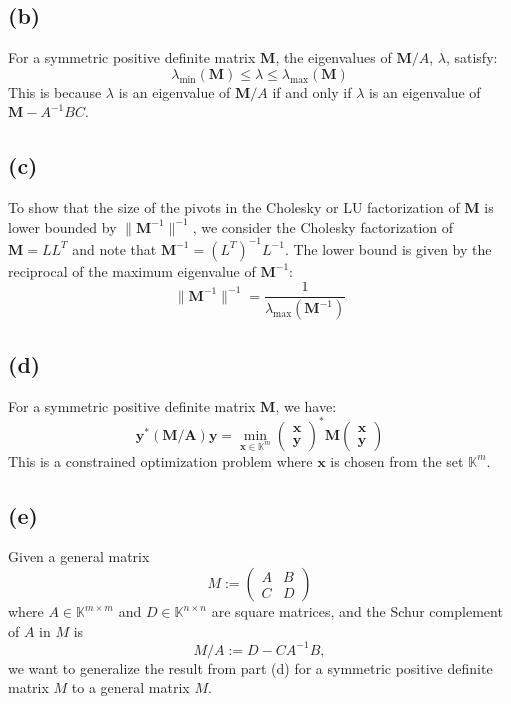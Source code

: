 \documentclass{article}
\begin{document}
\subsection{(b)}
For a symmetric positive definite matrix $\boldsymbol{M}$, the eigenvalues of $\boldsymbol{M}/A$, $\lambda$, satisfy:
\[
\lambda_{\min}(\boldsymbol{M}) \leq \lambda \leq \lambda_{\max}(\boldsymbol{M})
\]
This is because $\lambda$ is an eigenvalue of $\boldsymbol{M}/A$ if and only if $\lambda$ is an eigenvalue of $\boldsymbol{M}-A^{-1}BC$.

\subsection{(c)}
To show that the size of the pivots in the Cholesky or LU factorization of $\boldsymbol{M}$ is lower bounded by $\|\boldsymbol{M}^{-1}\|^{-1}$, we consider the Cholesky factorization of $\boldsymbol{M}=LL^T$ and note that $\boldsymbol{M}^{-1}=(L^T)^{-1}L^{-1}$. The lower bound is given by the reciprocal of the maximum eigenvalue of $\boldsymbol{M}^{-1}$:
\[
\|\boldsymbol{M}^{-1}\|^{-1} = \frac{1}{\lambda_{\max}(\boldsymbol{M}^{-1})}
\]

\subsection{(d)}
For a symmetric positive definite matrix $\boldsymbol{M}$, we have:
\[
\boldsymbol{y}^*(\boldsymbol{M} / \boldsymbol{A}) \boldsymbol{y}=\min_{\boldsymbol{x} \in \mathbb{K}^m}\left(\begin{array}{c}
\boldsymbol{x} \\
\boldsymbol{y}
\end{array}\right)^* \boldsymbol{M}\left(\begin{array}{c}
\boldsymbol{x} \\
\boldsymbol{y}
\end{array}\right)
\]
This is a constrained optimization problem where $\boldsymbol{x}$ is chosen from the set $\mathbb{K}^m$.

\subsection{(e)}

Given a general matrix 
\[ M := \begin{pmatrix} A & B \\ C & D \end{pmatrix} \]
where \( A \in \mathbb{K}^{m \times m} \) and \( D \in \mathbb{K}^{n \times n} \) are square matrices, and the Schur complement of \( A \) in \( M \) is 
\[ M/A := D - CA^{-1}B, \]
we want to generalize the result from part (d) for a symmetric positive definite matrix \( M \) to a general matrix \( M \).
\end{document}
